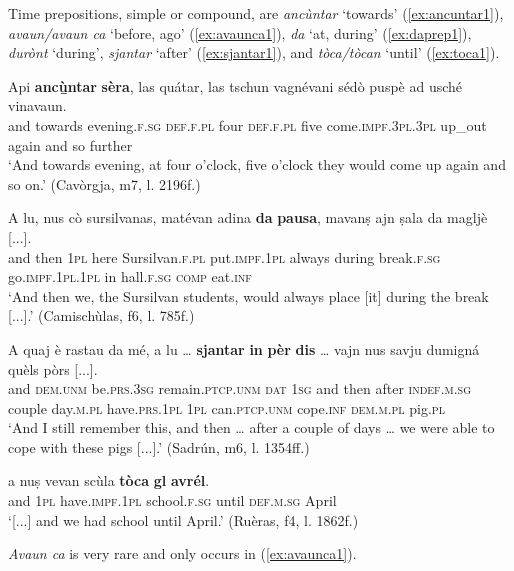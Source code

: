 Time prepositions, simple or compound, are \textit{ancùntar} `towards' (\ref{ex:ancuntar1}), \textit{avaun/avaun ca} `before, ago' (\ref{ex:avaunca1}), \textit{da} `at, during' (\ref{ex:daprep1}), \textit{durònt} `during', \textit{sjantar} `after' (\ref{ex:sjantar1}), and \textit{tòca/tòcan} `until' (\ref{ex:toca1}).

\ea
\label{ex:ancuntar1}
\gll Api \textbf{ancù̱ntar} \textbf{sèra}, las quátar, las tschun vagnévani sédò puspè ad usché vinavaun.\\
and towards evening.\textsc{f.sg} \textsc{def.f.pl} four \textsc{def.f.pl} five come.\textsc{impf.3pl.3pl} up\_out again and so further\\
\glt `And towards evening, at four o'clock, five o'clock they would come up again and so on.' (Cavòrgja, m7, l. 2196f.)
\z

\ea
\label{ex:daprep1}
\gll A lu, nus cò sursilvanas, matévan adina \textbf{da} \textbf{pausa}, mavanṣ ajn ṣala da magljè [...].\\
and then \textsc{1pl} here Sursilvan.\textsc{f.pl} put.\textsc{impf.1pl} always during break.\textsc{f.sg} go.\textsc{impf.1pl.1pl} in hall.\textsc{f.sg} \textsc{comp} eat.\textsc{inf}\\
\glt `And then we, the Sursilvan students, would always place [it] during the break [...].' (Camischùlas, f6, l. 785f.)
\z

\ea
\label{ex:sjantar1}
\gll    A quaj è rastau da mé, a lu … \textbf{sjantar} \textbf{in} \textbf{pèr} \textbf{dis} … vajn nus savju dumigná quèls pòrs [...].\\
and \textsc{dem.unm} be.\textsc{prs.3sg} remain.\textsc{ptcp.unm}  \textsc{dat}  \textsc{1sg} and then {} after \textsc{indef.m.sg} couple  day.\textsc{m.pl} {} have.\textsc{prs.1pl} \textsc{1pl} can.\textsc{ptcp.unm} cope.\textsc{inf} \textsc{dem.m.pl} pig.\textsc{pl}\\
\glt `And I still remember this, and then … after a couple of days … we were able to cope with these pigs [...].' (Sadrún, m6, l. 1354ff.)
\z

\ea
\label{ex:toca1}
\gll [...] a nuṣ vevan scùla \textbf{tòca} \textbf{gl} \textbf{avrél}.\\
{} and \textsc{1pl} have.\textsc{impf.1pl} school.\textsc{f.sg} until \textsc{def.m.sg} April\\
\glt `[...] and we had school until April.' (Ruèras, f4, l. 1862f.)
\z

\textit{Avaun ca} is very rare and only occurs in \citet{Büchli1966} (\ref{ex:avaunca1}).


